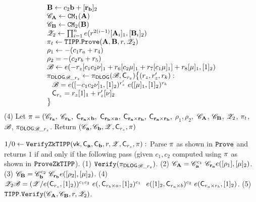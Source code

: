 \begin{small}
\begin{algorithm}[bt]
\[\begin{array}{l}
 {{\mathbf {B}}} \leftarrow c_2 {{\mathbf {b}}} + [{{\mathbf {r_b}}}]_2  \\
 {\mathscr{C}}_{{{\mathbf {A}}}} \leftarrow {\mathtt{CM}}_1({{\mathbf {A}}})  \\
 {\mathscr{C}}_{{{\mathbf {B}}}} \leftarrow {\mathtt{CM}}_2({{\mathbf {B}}})  \\
 {\mathscr{Z}}_2 \leftarrow \prod_{i=1}^n e(r^{2(i-1)} [{{\mathbf {A}}}_i]_1,
		[{{\mathbf {B}}}_i]_2)	  \\
 \pi_t \leftarrow {\mathtt{TIPP}}.\texttt{Prove}({{\mathbf {A}}}, {{\mathbf {B}}}, r, {\mathscr{Z}}_2) \\
 	   \rho_1 \leftarrow -(c_1 r_a + r_4)  \\
	   \rho_2 = -(c_2 r_b + r_5) \\
 	{\mathscr{B}} \leftarrow 
 	e(-r_z [c_1 c_2 \nu]_1 + r_6 [c_2 \mu]_1
 	+ r_7 [c_1 \mu]_1]  + r_8 [\mu]_1, [1]_2)  \\
	{\pi_{\textsf{DLOG}}}_{{\mathscr{B}}\_r_z} \leftarrow {\pi_{\textsf{DLOG}}}({\mathscr{B}},{\mathsf{C}}_{r_z}) 
	  \big\{(r_z, r_z', r_k): \\
	  \hspace*{0.1in}{\mathscr{B}} =  
	  	 e([-c_1c_2\nu]_1, [1]_2)^{r_z'} ~e([\mu]_1,  [1]_2) ^{r_k} \\
	  \hspace*{0.1in}{\mathsf{C}}_{r_z} = r_z[1]_1 + r_z'[\nu]_2 \\
	  \big\}
   \end{array} 
	\]
 (4) Let $\pi = ({\mathscr{C}}_{{\mathbf {r_a}}}, $
 			${\mathscr{C}}_{{\mathbf {r_b}}}, $
 			${\mathsf{C}}_{{\mathbf {r_a \times b}}}, $
 			${\mathsf{C}}_{{\mathbf {r_b \times a}}}, $
 			${\mathsf{C}}_{{\mathbf {r_a \times r_b}}}, $
 			${\mathsf{C}}_{{\mathbf {r_a \times r_b}}}, $
 			$\rho_1, \rho_2, $
			${\mathscr{C}}_{{\mathbf {A}}}$, ${\mathscr{C}}_{{\mathbf {B}}}$,
			${\mathscr{Z}}_2$,
			$\pi_t$, ${\mathscr{B}}$,
			${\pi_{\textsf{DLOG}}}_{{\mathscr{B}}\_r_z}$.
		Return $({\mathscr{C}}_{{{\mathbf {a}}}}, {\mathscr{C}}_{{{\mathbf {b}}}}, {\mathscr{Z}}, {\mathsf{C}}_{r_z},
				\pi)$

$1/0 \leftarrow {\mathtt{VerifyZkTIPP}}(\mathsf{vk}, 
	{\mathsf{C}}_{{{\mathbf {a}}}}, 
	{\mathsf{C}}_{{{\mathbf {b}}}}, r, {\mathscr{Z}}, {\mathsf{C}}_{r_z}, \pi):$  \newline
	Parse $\pi$ as shown in $\texttt{Prove}$ and returns $1$
	if and only if the following pass (given $c_1, c_2$ computed
	using $\pi$ as shown in ${\mathtt{ProveZkTIPP}}$).  \newline
	(1) $\texttt{Verify}({\pi_{\textsf{DLOG}}}_{{\mathscr{B}}\_{r_z}})$.  \newline
	(2) ${\mathscr{C}}_{{\mathbf {A}}} =  {\mathscr{C}}_{{\mathbf {a}}}^{c_1}  ~{\mathscr{C}}_{{\mathbf {r_a}}}
		 e([\rho_1], [\mu]_2)$. \newline
	(3) ${\mathscr{C}}_{{\mathbf {B}}} =  {\mathscr{C}}_{{\mathbf {b}}}^{c_2}  ~{\mathscr{C}}_{{\mathbf {r_b}}}
		 e([\rho_2], [\mu]_2)$. \newline
	(4) $\Z_2\B = 
			(\Z / e(\Commit_{r_z}, [1]_2))^{c_1 c_2} ~
			e(, \Commit_{r_b \times a}, [1]_2)^{c_1} \newline
			\hspace*{0.1in} e([1]_2, \Commit_{r_a \times b})^{c_2}~
			e(\Commit_{r_a \times r_b}, [1]_2)$.\newline
	(5) ${\mathtt{TIPP}}.\texttt{Verify}({\mathscr{C}}_{{\mathbf {A}}}, {\mathscr{C}}_{{\mathbf {B}}}, r, {\mathscr{Z}}_2)$.
\caption{Zero Knowledge TIPP Protocol}
\label{fig_zktipp}
\end{algorithm}
\end{small}

